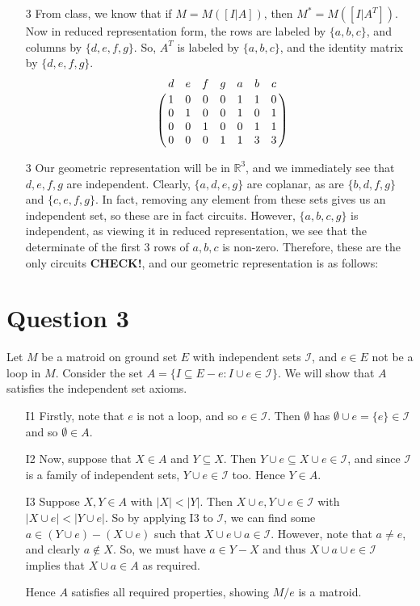 \documentclass{article}
\begin{document}
\begin{enumerate}
    \item[3] From class, we know that if $M=M([I|A])$, then $M^*=M([I|A^T])$. Now in reduced representation form, the rows are labeled by $\{a, b, c\}$,
        and columns by $\{d, e, f, g\}$. So, $A^T$ is labeled by $\{a, b, c\}$, and the identity matrix by $\{d, e, f, g\}$.
        \[
            \bordermatrix{
                & d & e & f & g & a & b & c \cr
                & 1 & 0 & 0 & 0 & 1 & 1 & 0 \cr
                & 0 & 1 & 0 & 0 & 1 & 0 & 1 \cr
                & 0 & 0 & 1 & 0 & 0 & 1 & 1 \cr
                & 0 & 0 & 0 & 1 & 1 & 3 & 3 
            }
        \]
    \item[3] Our geometric representation will be in $\mathbb{R}^3$, and we immediately see that $d, e, f, g$ are independent.
        Clearly, $\{a, d, e, g\}$ are coplanar, as are $\{b, d, f, g\}$ and $\{c, e, f, g\}$. In fact, removing any element from these sets 
        gives us an independent set, so these are in fact circuits.
        However, $\{a, b, c, g\}$ is independent, as viewing it in reduced representation, we see that 
        the determinate of the first 3 rows of $a, b, c$ is non-zero. Therefore, these are the only circuits \textbf{CHECK!}, 
        and our geometric representation is as follows:
        \begin{figure}
            \centering
            \caption{}
        \end{figure}
        
\end{enumerate}

\section*{Question 3}
Let $M$ be a matroid on ground set $E$ with independent sets $\mathcal{I}$, and $e\in E$ not be a loop in $M$.
Consider the set $A=\{I\subseteq E-e:I\cup e\in \mathcal{I}\}$. We will show that $A$ satisfies the independent set axioms.

\begin{enumerate}
    \item[I1] Firstly, note that $e$ is not a loop, and so $e\in\mathcal{I}$. Then $\emptyset$ has $\emptyset\cup e=\{e\}\in\mathcal{I}$
    and so $\emptyset\in A$.
    \item[I2] Now, suppose that $X\in A$ and $Y\subseteq X$. Then $Y\cup e\subseteq X\cup e\in\mathcal{I}$, and since $\mathcal{I}$
        is a family of independent sets, $Y\cup e\in\mathcal{I}$ too. Hence $Y\in A$.
    \item[I3] Suppose $X, Y\in A$ with $|X|<|Y|$. Then $X\cup e, Y\cup e\in\mathcal{I}$ with $|X\cup e|<|Y\cup e|$.
        So by applying I3 to $\mathcal{I}$, we can find some $a\in (Y\cup e)-(X\cup e)$ such that $X\cup e\cup a\in\mathcal{I}$.
        However, note that $a\ne e$, and clearly $a\not\in X$. So, we must have $a\in Y-X$ and thus $X\cup a\cup e\in\mathcal{I}$
        implies that $X\cup a\in A$ as required.

    Hence $A$ satisfies all required properties, showing $M/e$ is a matroid.
\end{enumerate}
\end{document}
